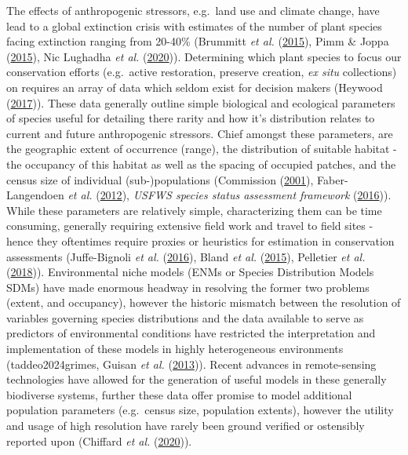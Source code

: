 \documentclass[
]{article}
\begin{document}
The effects of anthropogenic stressors, e.g.~land use and climate
change, have lead to a global extinction crisis with estimates of the
number of plant species facing extinction ranging from 20-40\% (Brummitt
\emph{et al.} (\protect\hyperlink{ref-brummitt2015green}{2015}), Pimm \&
Joppa (\protect\hyperlink{ref-pimm2015many}{2015}), Nic Lughadha
\emph{et al.} (\protect\hyperlink{ref-nic2020extinction}{2020})).
Determining which plant species to focus our conservation efforts
(e.g.~active restoration, preserve creation, \emph{ex situ} collections)
on requires an array of data which seldom exist for decision makers
(Heywood (\protect\hyperlink{ref-heywood2017plant}{2017})). These data
generally outline simple biological and ecological parameters of species
useful for detailing there rarity and how it's distribution relates to
current and future anthropogenic stressors. Chief amongst these
parameters, are the geographic extent of occurrence (range), the
distribution of suitable habitat - the occupancy of this habitat as well
as the spacing of occupied patches, and the census size of individual
(sub-)populations (Commission
(\protect\hyperlink{ref-natural2001iucn}{2001}), Faber-Langendoen
\emph{et al.} (\protect\hyperlink{ref-faber2012natureserve}{2012}),
\emph{USFWS species status assessment framework}
(\protect\hyperlink{ref-usfws2016ssa}{2016})). While these parameters
are relatively simple, characterizing them can be time consuming,
generally requiring extensive field work and travel to field sites -
hence they oftentimes require proxies or heuristics for estimation in
conservation assessments (Juffe-Bignoli \emph{et al.}
(\protect\hyperlink{ref-juffe2016assessing}{2016}), Bland \emph{et al.}
(\protect\hyperlink{ref-bland2015cost}{2015}), Pelletier \emph{et al.}
(\protect\hyperlink{ref-pelletier2018predicting}{2018})). Environmental
niche models (ENMs or Species Distribution Models SDMs) have made
enormous headway in resolving the former two problems (extent, and
occupancy), however the historic mismatch between the resolution of
variables governing species distributions and the data available to
serve as predictors of environmental conditions have restricted the
interpretation and implementation of these models in highly
heterogeneous environments (taddeo2024grimes, Guisan \emph{et al.}
(\protect\hyperlink{ref-guisan2013predicting}{2013})). Recent advances
in remote-sensing technologies have allowed for the generation of useful
models in these generally biodiverse systems, further these data offer
promise to model additional population parameters (e.g.~census size,
population extents), however the utility and usage of high resolution
have rarely been ground verified or ostensibly reported upon (Chiffard
\emph{et al.} (\protect\hyperlink{ref-chiffard2020anbs}{2020})).
\end{document}
